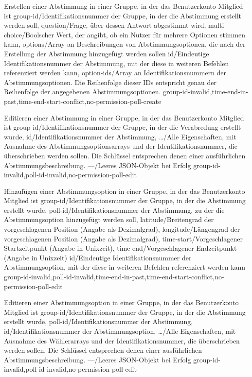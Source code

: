 \documentclass[parskip=full,11pt]{scrartcl}
\begin{document}
{Erstellen einer Abstimmung in einer Gruppe, in der das Benutzerkonto Mitglied
ist}
{group-id/Identifikationsnummer der Gruppe{,} in der die Abstimmung erstellt
werden soll,
question/Frage{,} über dessen Antwort abgestimmt wird,
multi-choice/Boolscher Wert{,} der angibt{,} ob ein Nutzer für mehrere
Optionen stimmen kann,
options/Array an Beschreibungen von Abstimmungsoptionen{,} die nach der
Erstellung der Abstimmung hinzugefügt werden sollen}
{id/Eindeutige Identifikationsnummer der Abstimmung{,} mit der diese in
weiteren Befehlen referenziert werden kann,
option-ids/Array an Identifikationsnummern der Abstimmungsoptionen. Die
Reihenfolge dieser IDs entspricht genau der Reihenfolge der angegebenen
Abstimmungsoptionen.}
{group-id-invalid,time-end-in-past,time-end-start-conflict,no-permission-poll-create}

{Editieren einer Abstimmung in einer Gruppe, in der das Benutzerkonto Mitglied
ist}
{group-id/Identifikationsnummer der Gruppe{,} in der die Verabredung erstellt
wurde,
id/Identifikationsnummer der Abstimmung,
\dots/Alle Eigenschaften{,} mit Ausnahme des Abstimmungsoptionsarrays und der
Identifikationsnummer{,} die überschrieben werden sollen.
Die Schlüssel entsprechen denen einer ausführlichen Abstimmungsbeschreibung.}
{---/Leeres JSON-Objekt bei Erfolg}
{group-id-invalid,poll-id-invalid,no-permission-poll-edit}

{Hinzufügen einer Abstimmungsoption in einer Gruppe, in der das Benutzerkonto Mitglied
ist}
{group-id/Identifikationsnummer der Gruppe{,} in der die Abstimmung erstellt
wurde,
poll-id/Identifikationsnummer der Abstimmung{,} zu der die Abstimmungsoption
hinzugefügt werden soll,
latitude/Breitengrad der vorgeschlagenen Position (Angabe als Dezimalgrad),
longitude/Längengrad der vorgeschlagenen Position (Angabe als Dezimalgrad),
time-start/Vorgeschlagener Startzeitpunkt (Angabe in Unixzeit),
time-end/Vorgeschlagener Endzeitpunkt (Angabe in Unixzeit)}
{id/Eindeutige Identifikationsnummer der Abstimmungsoption{,} mit der diese in
weiteren Befehlen referenziert werden kann}
{group-id-invalid,poll-id-invalid,time-end-in-past,time-end-start-conflict,no-permission-poll-edit}

{Editieren einer Abstimmungsoption in einer Gruppe, in der das Benutzerkonto
Mitglied ist}
{group-id/Identifikationsnummer der Gruppe{,} in der die Abstimmung erstellt
wurde,
poll-id/Identifikationsnummer der Abstimmung,
id/Identifikationsnummer der Abstimmungsoption,
\dots/Alle Eigenschaften{,} mit Ausnahme des Wählerarrays und der
Identifikationsnummer{,} die überschrieben werden sollen.
Die Schlüssel entsprechen denen einer ausführlichen Abstimmungsbeschreibung.}
{---/Leeres JSON-Objekt bei Erfolg}
{group-id-invalid,poll-id-invalid,no-permission-poll-edit}
\end{document}
